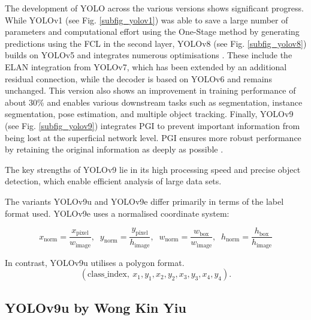 The development of \acrshort{YOLO} across the various versions shows significant progress. While \acrshort{YOLO}v1 (see Fig. \ref{subfig_yolov1}) was able to save a large number of parameters and computational effort using the One-Stage method by generating predictions using the \acrshort{FCL} in the second layer, \acrshort{YOLO}v8 (see Fig. \ref{subfig_yolov8}) builds on \acrshort{YOLO}v5 and integrates numerous optimisations \cite{Wang2024_yolo_review}. These include the \acrfull{ELAN} integration from \acrshort{YOLO}v7, which has been extended by an additional residual connection, while the decoder is based on \acrshort{YOLO}v6 and remains unchanged. This version also shows an improvement in training performance of about 30\% and enables various downstream tasks such as segmentation, instance segmentation, pose estimation, and multiple object tracking. Finally, \acrshort{YOLO}v9 (see Fig. \ref{subfig_yolov9}) integrates \acrshort{PGI} to prevent important information from being lost at the superficial network level. \acrshort{PGI} ensures more robust performance by retaining the original information as deeply as possible \cite{Wang2024_yolo_review}.

The key strengths of \acrshort{YOLO}v9 lie in its high processing speed and precise object detection, which enable efficient analysis of large data sets.
 
The variants \acrshort{YOLO}v9u and \acrshort{YOLO}v9e differ primarily in terms of the label format used. \acrshort{YOLO}v9e uses a normalised coordinate system:

\hypertarget{eq:yolov9}{}
\begin{equation}
x_\text{norm} = \frac{x_\text{pixel}}{w_\text{image}},\;\;
y_\text{norm} = \frac{y_\text{pixel}}{h_\text{image}},\;\;
w_\text{norm} = \frac{w_\text{box}}{w_\text{image}},\;\;
h_\text{norm} = \frac{h_\text{box}}{h_\text{image}}
\end{equation}
\label{Eq:yolov9}

\hypertarget{eq:yolov9u}{}
In contrast, \acrshort{YOLO}v9u utilises a polygon format.
\begin{equation}
(\text{class\_index},\ x_1, y_1, x_2, y_2, x_3, y_3, x_4, y_4).
\end{equation}



\subsection{YOLOv9u by Wong Kin Yiu}
\label{subsec:yolov9u}

